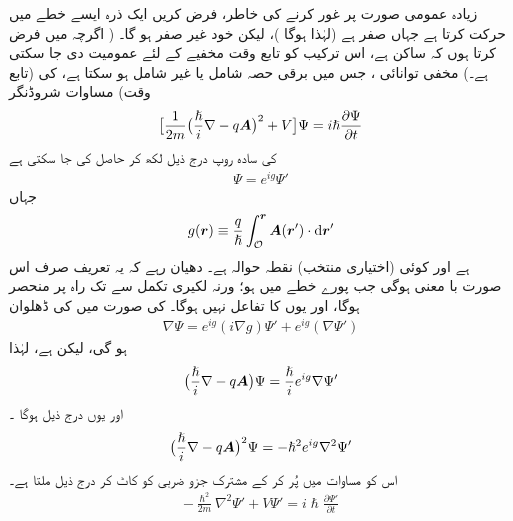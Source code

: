  زیادہ عمومی صورت  پر غور کرنے کی خاطر،  فرض کریں ایک ذرہ  ایسے خطے  میں حرکت کرتا ہے جہاں   صفر ہے (لہٰذا  ہوگا )، لیکن   خود غیر صفر ہو گا۔ ( اگرچہ میں فرض کرتا ہوں کہ  ساکن ہے،  اس ترکیب کو تابع وقت مخفیے  کے لئے عمومیت دی جا سکتی ہے۔) مخفی توانائی ،  جس میں برقی حصہ   شامل یا غیر شامل ہو سکتا ہے،  کی (تابع وقت)   مساوات شروڈنگر 
\begin{align}\label{مساوات_حر_تابع_وقت_مساوات_شروڈنگر_اہارونو}
\big [ \frac{1}{2m} \big ( \frac{\hslash}{i} \nabla - q {{\boldsymbol{A}}} \big )^2 + V \big ] \Psi = i \hslash \frac{\partial \Psi}{\partial t}
\end{align}
کی سادہ روپ درج ذیل لکھ کر حاصل کی جا سکتی ہے 
\begin{align}
\Psi = e^{i g} \Psi'
\end{align}
جہاں  
\begin{align}
g (\kvec{r}) \equiv \frac{q}{\hslash} \int_{\mathcal{O}}^{\kvec{r}} \kvec{A} (\kvec{r}') \cdot \dif \kvec{r}'
\end{align}
ہے اور  کوئی  (اختیاری منتخب)  نقطہ حوالہ ہے۔  دھیان رہے کہ یہ تعریف صرف اس صورت با معنی ہوگی جب پورے  خطے میں  ہو؛  ورنہ لکیری تکمل  سے  تک راہ پر منحصر ہوگا،  اور یوں  کا تفاعل نہیں ہوگا۔   کی صورت میں  کی ڈھلوان  
\begin{align*}
\nabla \Psi = e^{i g} (i \nabla g) \Psi' + e^{ig}(\nabla \Psi')
\end{align*}
ہو گی، لیکن  ہے،  لہٰذا 
\begin{align}
\big ( \frac{\hslash}{i} \nabla - q {{\boldsymbol{A}}} \big ) \Psi = \frac{\hslash}{i} e^{i g} \nabla \Psi'
\end{align}
اور یوں درج ذیل ہوگا ۔
\begin{align}
\big ( \frac{\hslash}{i} \nabla - q {{\boldsymbol{A}}} \big )^2 \Psi = - \hslash^2 e^{i g} \nabla^2 \Psi'
\end{align}
اس کو مساوات    میں پُر کر کے مشترک جزو ضربی  کو کاٹ کر درج ذیل ملتا ہے۔
\begin{align}\label{مساوات_حر_مساوات_شروڈنگر_بغیر_اے}
- \frac{\hslash^2}{2m} \nabla^2 \Psi' + V \Psi' = i \hslash \frac{\partial \Psi'}{\partial t}
\end{align}
%
